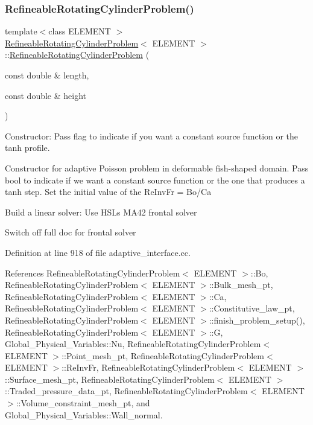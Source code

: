 \subsubsection{\texorpdfstring{Refineable\+Rotating\+Cylinder\+Problem()}{RefineableRotatingCylinderProblem()}}
{\footnotesize\ttfamily template$<$class E\+L\+E\+M\+E\+NT $>$ \\
\hyperlink{classRefineableRotatingCylinderProblem}{Refineable\+Rotating\+Cylinder\+Problem}$<$ E\+L\+E\+M\+E\+NT $>$\+::\hyperlink{classRefineableRotatingCylinderProblem}{Refineable\+Rotating\+Cylinder\+Problem} (\begin{DoxyParamCaption}\item[{const double \&}]{length,  }\item[{const double \&}]{height }\end{DoxyParamCaption})}

Constructor\+: Pass flag to indicate if you want a constant source function or the tanh profile.

Constructor for adaptive Poisson problem in deformable fish-\/shaped domain. Pass bool to indicate if we want a constant source function or the one that produces a tanh step. Set the initial value of the Re\+Inv\+Fr = Bo/\+Ca

Build a linear solver\+: Use H\+SL\textquotesingle{}s M\+A42 frontal solver

Switch off full doc for frontal solver 

Definition at line 918 of file adaptive\+\_\+interface.\+cc.



References Refineable\+Rotating\+Cylinder\+Problem$<$ E\+L\+E\+M\+E\+N\+T $>$\+::\+Bo, Refineable\+Rotating\+Cylinder\+Problem$<$ E\+L\+E\+M\+E\+N\+T $>$\+::\+Bulk\+\_\+mesh\+\_\+pt, Refineable\+Rotating\+Cylinder\+Problem$<$ E\+L\+E\+M\+E\+N\+T $>$\+::\+Ca, Refineable\+Rotating\+Cylinder\+Problem$<$ E\+L\+E\+M\+E\+N\+T $>$\+::\+Constitutive\+\_\+law\+\_\+pt, Refineable\+Rotating\+Cylinder\+Problem$<$ E\+L\+E\+M\+E\+N\+T $>$\+::finish\+\_\+problem\+\_\+setup(), Refineable\+Rotating\+Cylinder\+Problem$<$ E\+L\+E\+M\+E\+N\+T $>$\+::G, Global\+\_\+\+Physical\+\_\+\+Variables\+::\+Nu, Refineable\+Rotating\+Cylinder\+Problem$<$ E\+L\+E\+M\+E\+N\+T $>$\+::\+Point\+\_\+mesh\+\_\+pt, Refineable\+Rotating\+Cylinder\+Problem$<$ E\+L\+E\+M\+E\+N\+T $>$\+::\+Re\+Inv\+Fr, Refineable\+Rotating\+Cylinder\+Problem$<$ E\+L\+E\+M\+E\+N\+T $>$\+::\+Surface\+\_\+mesh\+\_\+pt, Refineable\+Rotating\+Cylinder\+Problem$<$ E\+L\+E\+M\+E\+N\+T $>$\+::\+Traded\+\_\+pressure\+\_\+data\+\_\+pt, Refineable\+Rotating\+Cylinder\+Problem$<$ E\+L\+E\+M\+E\+N\+T $>$\+::\+Volume\+\_\+constraint\+\_\+mesh\+\_\+pt, and Global\+\_\+\+Physical\+\_\+\+Variables\+::\+Wall\+\_\+normal.



